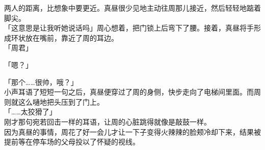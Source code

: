 两人的距离，比想象中要更近。真昼很少见地主动往周那儿接近，然后轻轻地踮着脚尖。\\

「这意思是让我听她说话吗」周心想着，把门锁上后弯下了腰。接着，真昼将手形成环状放在嘴前，靠近了周的耳边。\\

「周君」

「嗯？」

「那个……很帅，哦？」\\

小声耳语了短短一句之后，真昼便穿过了周的身侧，快步走向了电梯间里面。而周则就这么嗵地把头压到了门上。\\

「……太狡猾了」\\

刚才那句宛若回击一样的耳语，让周的心脏跳得就像是敲鼓一样。\\

因为真昼的事情，周花了好一会儿才让一下子变得火辣辣的脸颊冷却下来，结果被提前等在停车场的父母投以了怀疑的视线。
